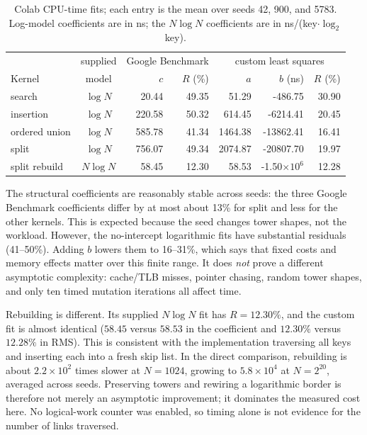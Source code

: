 \documentclass[10pt,a4paper]{article}
\begin{document}
\begin{table}[!t]
\centering
\caption{Colab CPU-time fits; each entry is the mean over seeds 42, 900, and 5783.  Log-model coefficients are in ns; the \(N\log N\) coefficients are in ns/(key\(\cdot\log_2\)key).}
\label{tab:fits}
\small
\setlength{\tabcolsep}{3.3pt}
\begin{tabular}{@{}l c r r r r r@{}}
\toprule
& supplied & \multicolumn{2}{c}{Google Benchmark} & \multicolumn{3}{c}{custom least squares}\\
Kernel & model & \(c\) & \(R\) (\%) & \(a\) & \(b\) (ns) & \(R\) (\%)\\
\midrule
search          & \(\log N\) & 20.44  & 49.35 & 51.29   & -486.75       & 30.90\\
insertion       & \(\log N\) & 220.58 & 50.32 & 614.45  & -6214.41      & 20.45\\
ordered union   & \(\log N\) & 585.78 & 41.34 & 1464.38 & -13862.41     & 16.41\\
split           & \(\log N\) & 756.07 & 49.34 & 2074.87 & -20807.70     & 19.97\\
split rebuild   & \(N\log N\) & 58.45 & 12.30 & 58.53 & -1.50\(\times10^6\) & 12.28\\
\bottomrule
\end{tabular}
\end{table}

The structural coefficients are reasonably stable across seeds: the three
Google Benchmark coefficients differ by at most about 13\% for split and less for the
other kernels.  This is expected because the seed changes tower shapes, not
the workload.  However, the no-intercept logarithmic fits have substantial
residuals (41--50\%).  Adding \(b\) lowers them to 16--31\%, which says that
fixed costs and memory effects matter over this finite range.  It does \emph{not}
prove a different asymptotic complexity: cache/TLB misses, pointer chasing,
random tower shapes, and only ten timed mutation iterations all affect time.

Rebuilding is different.  Its supplied \(N\log N\) fit has \(R=12.30\%\),
and the custom fit is almost identical (\(58.45\) versus \(58.53\) in the
coefficient and \(12.30\%\) versus \(12.28\%\) in RMS).  This is consistent
with the implementation traversing all keys and inserting each into a fresh
skip list.  In the direct comparison, rebuilding is about \(2.2\times10^2\)
times slower at \(N=1024\), growing to \(5.8\times10^4\) at \(N=2^{20}\), averaged
across seeds.  Preserving towers and rewiring a logarithmic border is therefore
not merely an asymptotic improvement; it dominates the measured cost here.
No logical-work counter was enabled, so timing alone is not evidence for the
number of links traversed.
\end{document}

